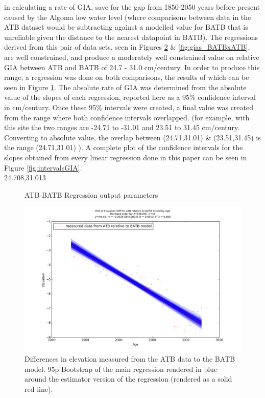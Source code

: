 in calculating a rate of GIA, save for the gap from 1850-2050 years before
 present caused by the Algoma low water level (where comparisons between data in the ATB dataset would be
 subtracting against a modelled value for BATB that is unreliable given
 the distance to the nearest datapoint in BATB). The regressions derived from this pair of data sets,
 seen in Figures \ref{fig:gias_ATBxBATB} \& \ref{fig:gias_BATBxATB}, are well
 constrained, and produce a moderately well constrained value on relative GIA
 between ATB and BATB of 24.7 - 31.0 cm/century. In order to produce this range, a
 regression was done on both comparisons, the results of which can be seen in
 Figure \ref{fig:ATBxBATB_regression}. The absolute rate of GIA was determined from the
 absolute value of the slopes of each regression, reported here as a 95\% confidence interval
 in cm/century. Once these 95\% intervals were created, a final value was created
 from the range where both confidence intervals overlapped. (for example, with this
 site the two ranges are -24.71 to -31.01 and 23.51 to 31.45 cm/century. Converting
 to absolute value, the overlap between (24.71,31.01) \& (23.51,31.45) is the range
 (24.71,31.01) ). A complete plot of the confidence intervals
 for the slopes obtained from every linear regression done in this paper can be seen in Figure \ref{fig:intervalsGIA}. \\
24.708,31.013

\begin{figure}[H]
	\begin{flushleft}
	\end{flushleft}
	\caption{ATB-BATB Regression output parameters}
	\label{fig:ATBxBATB_regression}
\end{figure}

\newpage

\begin{figure}[H]
	\includegraphics[width=1.7\linewidth, angle=270 ]{data/bothNonZero/withinSeventyFivePercent/gias/theGIA_ATB_relative_to_BATB.png}
	\caption{Differences in elevation measured from the ATB data to the BATB model. 95p Bootstrap of the main regression rendered in blue around the estimator version of the regression (rendered as a solid red line).}
	\label{fig:gias_ATBxBATB}
\end{figure}


